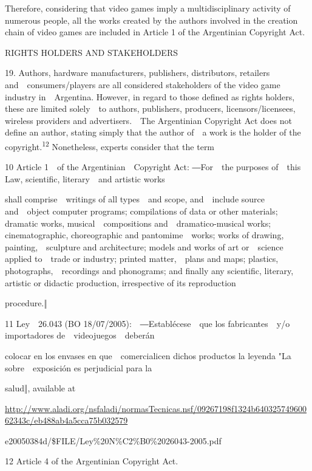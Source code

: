 \documentclass[
]{article}
\begin{document}
{Therefore, considering that video games imply a multidisciplinary
activity of numerous people, all the works created by the }{authors
}{involved in the creation chain of video games are included in Article
1 of the Argentinian }{Copyright Act}{.}

{RIGHTS HOLDERS AND STAKEHOLDERS}

{19. }{Authors, hardware manufacturers, publishers, distributors,
retailers and~~consumers/players are all considered stakeholders of the
video game industry in~~Argentina. However, in regard to those defined
as rights holders, these are limited solely~~to authors, publishers,
producers, licensors/licensees, wireless providers and advertisers.~~The
Argentinian }{Copyright Act }{does not define an }{author}{, stating
simply that the author of~~a work is the holder of the
copyright.}\textsuperscript{{12 }}{Nonetheless, experts consider that
the term}

{10 }{Article 1~~of the Argentinian~~}{Copyright Act}{: }{―For~~the
purposes of~~this Law, scientific, literary~~and artistic works}

{shall comprise~~writings of all types~~and scope, and~~include source
and~~object computer programs; compilations of data or other materials;
dramatic works, musical~~compositions and~~dramatico-musical works;
cinematographic, choreographic and pantomime~~works; works of drawing,
painting,~~sculpture and architecture; models and works of art
or~~science applied to~~trade or industry; printed matter,~~plans and
maps; plastics, photographs,~~recordings and phonograms; and finally any
scientific, literary, artistic or didactic production, irrespective of
its reproduction}

{procedure.}{‖}

{11 }{Ley~~26.043 (BO 18/07/2005):~~―}{Establécese~~que los
fabricantes~~y/o importadores de~~videojuegos~~deberán}

{colocar en los envases en que~~comercialicen dichos productos la
leyenda "La sobre~~exposición es perjudicial para la}

{salud}{‖, available at}

\href{http://www.aladi.org/nsfaladi/normasTecnicas.nsf/09267198f1324b64032574960062343c/eb488ab4a5cca75b032579}{{http://www.aladi.org/nsfaladi/normasTecnicas.nsf/09267198f1324b64032574960062343c/eb488ab4a5cca75b032579}}

{e20050384d/\$FILE/Ley\%20N\%C2\%B0\%2026043-2005.pdf}

{12 }{Article 4 of the Argentinian }{Copyright Act}{.}
\end{document}
